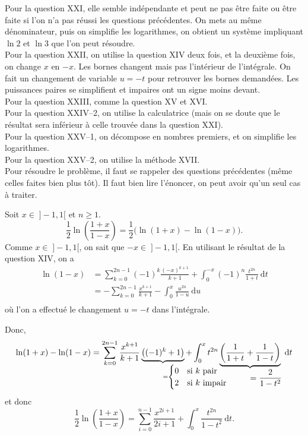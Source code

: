 \documentclass[a4paper]{report}
\begin{document}
	Pour la question XXI, elle semble indépendante et peut ne pas être faite ou être faite si l'on n'a pas réussi les questions précédentes. On mets au même dénominateur, puis on simplifie les logarithmes, on obtient un système impliquant $\ln 2$ et $\ln 3$ que l'on peut résoudre.\\
	Pour la question XXII, on utilise la question XIV deux fois, et la deuxième fois, on change $x$ en $-x$. Les bornes changent mais pas l'intérieur de l'intégrale. On fait un changement de variable $u = -t$ pour retrouver les bornes demandées. Les puissances paires se simplifient et impaires ont un signe moins devant.\\
	Pour la question XXIII, comme la question XV et XVI.\\
	Pour la question XXIV--2, on utilise la calculatrice (mais on se doute que le résultat sera inférieur à celle trouvée dans la question XXI).\\
	Pour la question XXV--1, on décompose en nombres premiers, et on simplifie les logarithmes.\\
	Pour la question XXV--2, on utilise la méthode XVII.\\

	Pour résoudre le problème, il faut se rappeler des questions précédentes (même celles faites bien plus tôt). Il faut bien lire l'énoncer, on peut avoir qu'un seul cas à traiter.

	\bigskip
	\medskip

	Soit $x \in \;]-1,1[$ et $n \ge 1$.\[
		\frac{1}{2} \ln\left( \frac{1+x}{1-x} \right) = \frac{1}{2}\big(\ln(1+x) - \ln(1-x)\big).
	\] Comme $x \in\;]-1,1[$, on sait que $-x \in \;]-1,1[$. En utilisant le résultat de la question XIV, on a
	\begin{align*}
		\ln(1-x) &= \sum_{k=0}^{2n-1} (-1)^k \frac{(-x)^{k+1}}{k+1} + \int_{0}^{-x} (-1)^n \frac{t^{2n}}{1+t}~\mathrm{d}t\\
		&= -\sum_{k=0}^{2n-1} \frac{x^{k+1}}{k+1} -\int_{0}^{x} \frac{u^{2n}}{1-u}~\mathrm{d}u \\
	\end{align*} où l'on a effectué le changement $u = -t$ dans l'intégrale.

	Donc, \[
		\ln(1+x) - \ln(1-x) = \sum_{k=0}^{2n-1} \frac{x^{k+1}}{k+1} \underbrace{\left( (-1)^k + 1 \right)}_{\mathrlap{=\begin{cases}
				0&\text{si } k \text{ pair}\\
				2&\text{si } k \text{ impair}
		\end{cases}}} + \int_{0}^{x} t^{2n}\underbrace{\left( \frac{1}{1+t} + \frac{1}{1-t} \right)}_{\mathrlap{\displaystyle= \frac{2}{1-t^2}}}~\mathrm{d}t
	\] et donc \[
		\frac{1}{2}\ln\left( \frac{1+x}{1-x} \right) = \sum_{i=0}^{n-1} \frac{x^{2i+1}}{2i+1} + \int_{0}^{x} \frac{t^{2n}}{1-t^2}~\mathrm{d}t
	.\]
\end{document}
